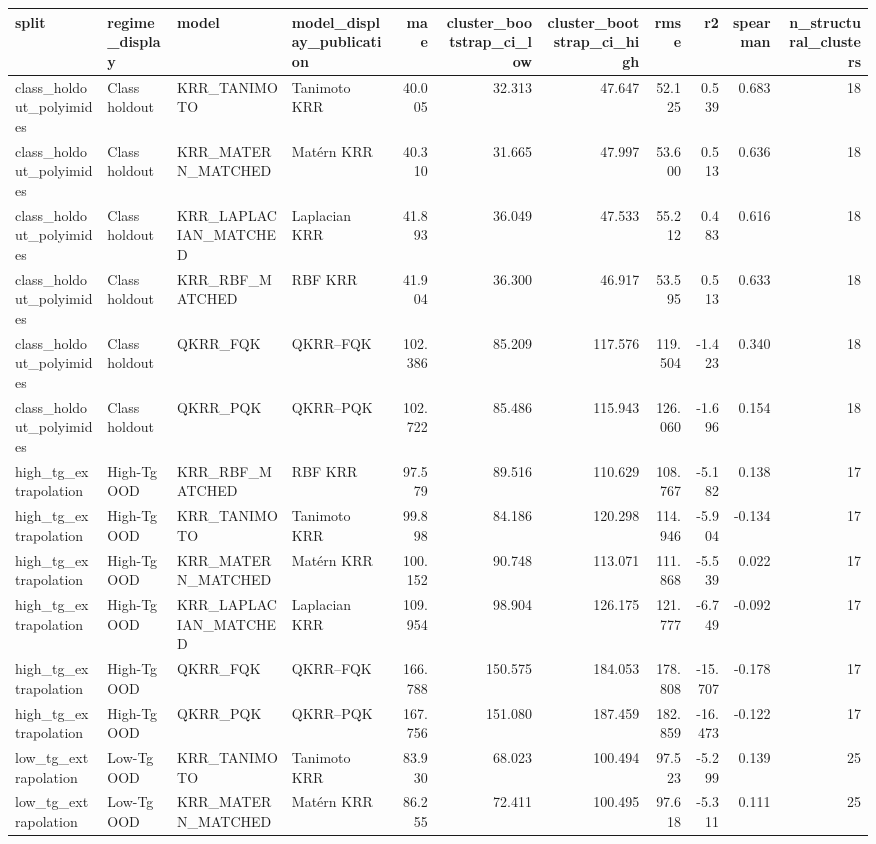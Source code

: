\begin{tabular}{llllrrrrrrr}
\toprule
split & regime\_display & model & model\_display\_publication & mae & cluster\_bootstrap\_ci\_low & cluster\_bootstrap\_ci\_high & rmse & r2 & spearman & n\_structural\_clusters \\
\midrule
class\_holdout\_polyimides & Class holdout & KRR\_TANIMOTO & Tanimoto KRR & 40.005 & 32.313 & 47.647 & 52.125 & 0.539 & 0.683 & 18 \\
class\_holdout\_polyimides & Class holdout & KRR\_MATERN\_MATCHED & Matérn KRR & 40.310 & 31.665 & 47.997 & 53.600 & 0.513 & 0.636 & 18 \\
class\_holdout\_polyimides & Class holdout & KRR\_LAPLACIAN\_MATCHED & Laplacian KRR & 41.893 & 36.049 & 47.533 & 55.212 & 0.483 & 0.616 & 18 \\
class\_holdout\_polyimides & Class holdout & KRR\_RBF\_MATCHED & RBF KRR & 41.904 & 36.300 & 46.917 & 53.595 & 0.513 & 0.633 & 18 \\
class\_holdout\_polyimides & Class holdout & QKRR\_FQK & QKRR–FQK & 102.386 & 85.209 & 117.576 & 119.504 & -1.423 & 0.340 & 18 \\
class\_holdout\_polyimides & Class holdout & QKRR\_PQK & QKRR–PQK & 102.722 & 85.486 & 115.943 & 126.060 & -1.696 & 0.154 & 18 \\
high\_tg\_extrapolation & High-Tg OOD & KRR\_RBF\_MATCHED & RBF KRR & 97.579 & 89.516 & 110.629 & 108.767 & -5.182 & 0.138 & 17 \\
high\_tg\_extrapolation & High-Tg OOD & KRR\_TANIMOTO & Tanimoto KRR & 99.898 & 84.186 & 120.298 & 114.946 & -5.904 & -0.134 & 17 \\
high\_tg\_extrapolation & High-Tg OOD & KRR\_MATERN\_MATCHED & Matérn KRR & 100.152 & 90.748 & 113.071 & 111.868 & -5.539 & 0.022 & 17 \\
high\_tg\_extrapolation & High-Tg OOD & KRR\_LAPLACIAN\_MATCHED & Laplacian KRR & 109.954 & 98.904 & 126.175 & 121.777 & -6.749 & -0.092 & 17 \\
high\_tg\_extrapolation & High-Tg OOD & QKRR\_FQK & QKRR–FQK & 166.788 & 150.575 & 184.053 & 178.808 & -15.707 & -0.178 & 17 \\
high\_tg\_extrapolation & High-Tg OOD & QKRR\_PQK & QKRR–PQK & 167.756 & 151.080 & 187.459 & 182.859 & -16.473 & -0.122 & 17 \\
low\_tg\_extrapolation & Low-Tg OOD & KRR\_TANIMOTO & Tanimoto KRR & 83.930 & 68.023 & 100.494 & 97.523 & -5.299 & 0.139 & 25 \\
low\_tg\_extrapolation & Low-Tg OOD & KRR\_MATERN\_MATCHED & Matérn KRR & 86.255 & 72.411 & 100.495 & 97.618 & -5.311 & 0.111 & 25 \\

\end{tabular}
